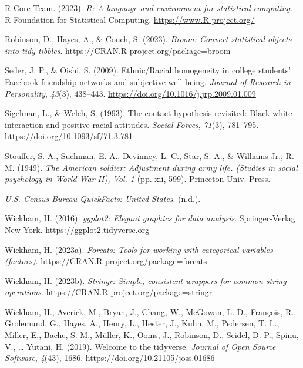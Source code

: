 \documentclass[
  man,floatsintext]{apa7}
\newlength{\cslhangindent}
\newlength{\cslentryspacingunit} %
\newenvironment{CSLReferences}[2] %
 {%
  \setlength{\parindent}{0pt}
  \ifodd #1
  \let\oldpar\par
  \def\par{\hangindent=\cslhangindent\oldpar}
  \fi
  \setlength{\parskip}{#2\cslentryspacingunit}
 }%
 {}
\begin{document}
\begin{CSLReferences}{1}{0}
\leavevmode{}%
R Core Team. (2023). \emph{R: A language and environment for statistical computing}. R Foundation for Statistical Computing. \url{https://www.R-project.org/}

\leavevmode{}%
Robinson, D., Hayes, A., \& Couch, S. (2023). \emph{Broom: Convert statistical objects into tidy tibbles}. \url{https://CRAN.R-project.org/package=broom}

\leavevmode{}%
Seder, J. P., \& Oishi, S. (2009). Ethnic/{Racial} homogeneity in college students' {Facebook} friendship networks and subjective well-being. \emph{Journal of Research in Personality}, \emph{43}(3), 438--443. \url{https://doi.org/10.1016/j.jrp.2009.01.009}

\leavevmode{}%
Sigelman, L., \& Welch, S. (1993). The contact hypothesis revisited: {Black-white} interaction and positive racial attitudes. \emph{Social Forces}, \emph{71}(3), 781--795. \url{https://doi.org/10.1093/sf/71.3.781}

\leavevmode{}%
Stouffer, S. A., Suchman, E. A., Devinney, L. C., Star, S. A., \& Williams Jr., R. M. (1949). \emph{The {American} soldier: {Adjustment} during army life. ({Studies} in social psychology in {World War II}), {Vol}. 1} (pp. xii, 599). Princeton Univ. Press.

\leavevmode{}%
\emph{U.{S}. {Census Bureau QuickFacts}: {United States}}. (n.d.).

\leavevmode{}%
Wickham, H. (2016). \emph{ggplot2: Elegant graphics for data analysis}. Springer-Verlag New York. \url{https://ggplot2.tidyverse.org}

\leavevmode{}%
Wickham, H. (2023a). \emph{Forcats: Tools for working with categorical variables (factors)}. \url{https://CRAN.R-project.org/package=forcats}

\leavevmode{}%
Wickham, H. (2023b). \emph{Stringr: Simple, consistent wrappers for common string operations}. \url{https://CRAN.R-project.org/package=stringr}

\leavevmode{}%
Wickham, H., Averick, M., Bryan, J., Chang, W., McGowan, L. D., François, R., Grolemund, G., Hayes, A., Henry, L., Hester, J., Kuhn, M., Pedersen, T. L., Miller, E., Bache, S. M., Müller, K., Ooms, J., Robinson, D., Seidel, D. P., Spinu, V., \ldots{} Yutani, H. (2019). Welcome to the {tidyverse}. \emph{Journal of Open Source Software}, \emph{4}(43), 1686. \url{https://doi.org/10.21105/joss.01686}


\end{CSLReferences}
\end{document}
